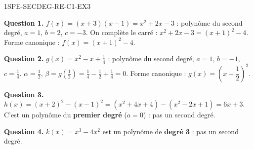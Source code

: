 
\begin{corrige}{1SPE-SECDEG-RE-C1-EX3}

\textbf{Question 1.} $f(x) = (x+3)(x-1) = x^2 + 2x - 3$ : polynôme du second degré, $a = 1$, $b = 2$, $c = -3$.
On complète le carré : $x^2+2x-3=(x+1)^2-4$.
Forme canonique : $f(x) = (x+1)^2 - 4$.

\textbf{Question 2.} $g(x) = x^2 - x + \frac{1}{4}$ : polynôme du second degré, $a = 1$, $b = -1$, $c = \frac{1}{4}$.
$\alpha = \frac{1}{2}$, $\beta = g\!\left(\frac{1}{2}\right) = \frac{1}{4} - \frac{1}{2} + \frac{1}{4} = 0$.
Forme canonique : $g(x) = \left(x - \dfrac{1}{2}\right)^2$.


\textbf{Question 3.} $h(x) = (x+2)^2 - (x-1)^2 = (x^2+4x+4) - (x^2-2x+1) = 6x + 3$.
C'est un polynôme du \textbf{premier degré} ($a = 0$) : pas un second degré.

\textbf{Question 4.} $k(x) = x^3 - 4x^2$ est un polynôme de \textbf{degré 3} : pas un second degré.

\end{corrige}
